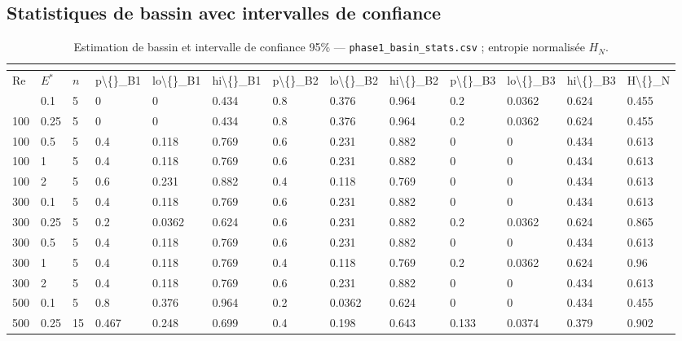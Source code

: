 \documentclass[11pt,a4paper]{article}
\begin{document}
\subsection{Statistiques de bassin avec intervalles de confiance}

\begingroup\scriptsize
    \setlength{\tabcolsep}{2pt}
    \begin{longtable}{*{13}{l}}
    \caption{Estimation de bassin et intervalle de confiance 95\% --- \texttt{phase1\_basin\_stats.csv} ; entropie normalisée $H_N$.}\\
    \label{tab:p1_basins}\\
    \toprule
    Re & $E^*$ & $n$ & p\textbackslash\{\}\_B1 & lo\textbackslash\{\}\_B1 & hi\textbackslash\{\}\_B1 & p\textbackslash\{\}\_B2 & lo\textbackslash\{\}\_B2 & hi\textbackslash\{\}\_B2 & p\textbackslash\{\}\_B3 & lo\textbackslash\{\}\_B3 & hi\textbackslash\{\}\_B3 & H\textbackslash\{\}\_N \\
    \midrule
    \endhead
    \bottomrule
    \endlastfoot
    100 & 0.1 & 5 & 0 & 0 & 0.434 & 0.8 & 0.376 & 0.964 & 0.2 & 0.0362 & 0.624 & 0.455 \\
    100 & 0.25 & 5 & 0 & 0 & 0.434 & 0.8 & 0.376 & 0.964 & 0.2 & 0.0362 & 0.624 & 0.455 \\
    100 & 0.5 & 5 & 0.4 & 0.118 & 0.769 & 0.6 & 0.231 & 0.882 & 0 & 0 & 0.434 & 0.613 \\
    100 & 1 & 5 & 0.4 & 0.118 & 0.769 & 0.6 & 0.231 & 0.882 & 0 & 0 & 0.434 & 0.613 \\
    100 & 2 & 5 & 0.6 & 0.231 & 0.882 & 0.4 & 0.118 & 0.769 & 0 & 0 & 0.434 & 0.613 \\
    300 & 0.1 & 5 & 0.4 & 0.118 & 0.769 & 0.6 & 0.231 & 0.882 & 0 & 0 & 0.434 & 0.613 \\
    300 & 0.25 & 5 & 0.2 & 0.0362 & 0.624 & 0.6 & 0.231 & 0.882 & 0.2 & 0.0362 & 0.624 & 0.865 \\
    300 & 0.5 & 5 & 0.4 & 0.118 & 0.769 & 0.6 & 0.231 & 0.882 & 0 & 0 & 0.434 & 0.613 \\
    300 & 1 & 5 & 0.4 & 0.118 & 0.769 & 0.4 & 0.118 & 0.769 & 0.2 & 0.0362 & 0.624 & 0.96 \\
    300 & 2 & 5 & 0.4 & 0.118 & 0.769 & 0.6 & 0.231 & 0.882 & 0 & 0 & 0.434 & 0.613 \\
    500 & 0.1 & 5 & 0.8 & 0.376 & 0.964 & 0.2 & 0.0362 & 0.624 & 0 & 0 & 0.434 & 0.455 \\
    500 & 0.25 & 15 & 0.467 & 0.248 & 0.699 & 0.4 & 0.198 & 0.643 & 0.133 & 0.0374 & 0.379 & 0.902 \\

\end{longtable}
\end{document}
